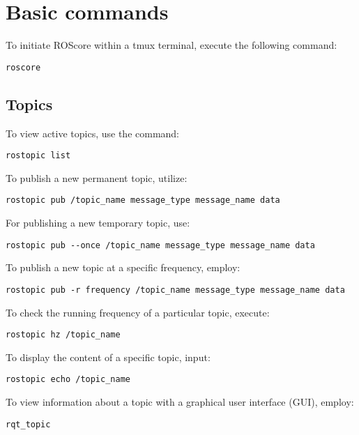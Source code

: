 \section{Basic commands}

To initiate ROScore within a tmux terminal, execute the following command: 
\begin{verbatim}
roscore
\end{verbatim}

\subsection{Topics}
To view active topics, use the command:
\begin{verbatim}
rostopic list
\end{verbatim}
To publish a new permanent topic, utilize:
\begin{verbatim}
rostopic pub /topic_name message_type message_name data
\end{verbatim}
For publishing a new temporary topic, use:
\begin{verbatim}
rostopic pub --once /topic_name message_type message_name data
\end{verbatim}
To publish a new topic at a specific frequency, employ:
\begin{verbatim}
rostopic pub -r frequency /topic_name message_type message_name data
\end{verbatim}
To check the running frequency of a particular topic, execute:
\begin{verbatim}
rostopic hz /topic_name
\end{verbatim}
To display the content of a specific topic, input:
\begin{verbatim}
rostopic echo /topic_name
\end{verbatim}
To view information about a topic with a graphical user interface (GUI), employ:
\begin{verbatim}
rqt_topic
\end{verbatim}

